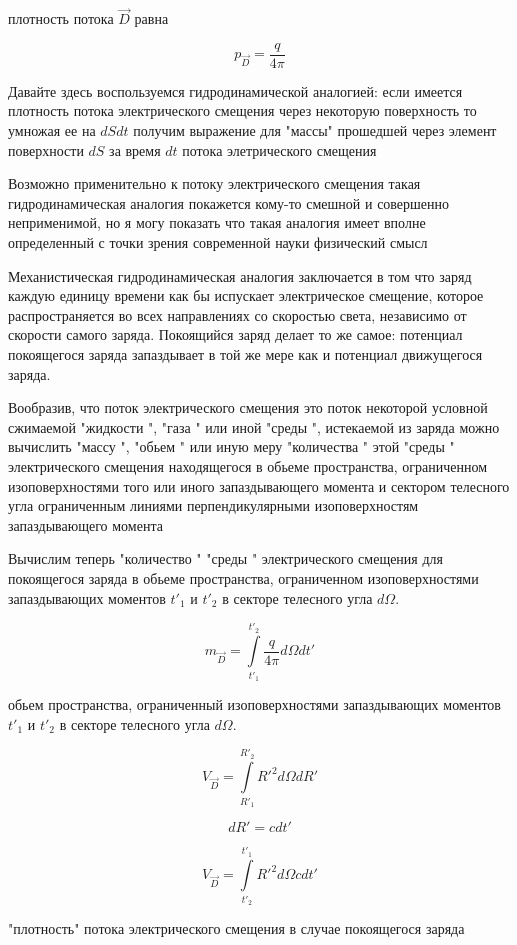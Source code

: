 \documentclass{article}
\begin{document}
плотность потока $\vec D$ равна

$$p_{\vec D} = \frac{q}{4\pi}$$

Давайте здесь воспользуемся гидродинамической аналогией: если имеется плотность потока электрического смещения через некоторую поверхность то умножая ее на $dS dt$  получим выражение для "массы" прошедшей через элемент поверхности $dS$ за время $dt$ потока элетрического смещения

Возможно применительно к потоку электрического смещения такая гидродинамическая аналогия покажется кому-то смешной и совершенно неприменимой, но я могу показать что такая аналогия имеет вполне определенный с точки зрения современной науки физический смысл

Механистическая гидродинамическая аналогия заключается в том что заряд каждую единицу времени как бы испускает электрическое смещение, которое распространяется во всех направлениях со скоростью света, независимо от скорости самого заряда. Покоящийся заряд делает то же самое: потенциал покоящегося заряда запаздывает в той же мере как и потенциал движущегося заряда.

Вообразив, что поток электрического смещения это поток некоторой условной сжимаемой "жидкости ", "газа " или иной "среды ", истекаемой из заряда можно вычислить "массу ", "обьем " или иную меру "количества " этой "среды " электрического смещения находящегося в обьеме пространства, ограниченном изоповерхностями того или иного запаздывающего момента и сектором телесного угла ограниченным линиями перпендикулярными изоповерхностям запаздывающего момента

Вычислим теперь "количество " "среды " электрического смещения для покоящегося заряда в обьеме пространства, ограниченном изоповерхностями запаздывающих моментов  $t'_{1}$ и $t'_{2}$ в секторе телесного угла $d\Omega$.

$$m_{\vec D} = \int\limits_{t'_{1}}^{t'_{2}}\frac{q}{4\pi}d\Omega d t'$$

обьем пространства, ограниченный изоповерхностями запаздывающих моментов  $t'_{1}$ и $t'_{2}$ в секторе телесного угла $d\Omega$.

$$V_{\vec D} = \int\limits_{R'_{1}}^{R'_{2}}{R'}^2 d\Omega d R' $$


$$d R' = c d t'$$

$$V_{\vec D} = \int\limits_{t'_{2}}^{t'_{1}}{R'}^2 d \Omega c d t'$$


"плотность" потока электрического смещения в случае покоящегося заряда
\end{document}
